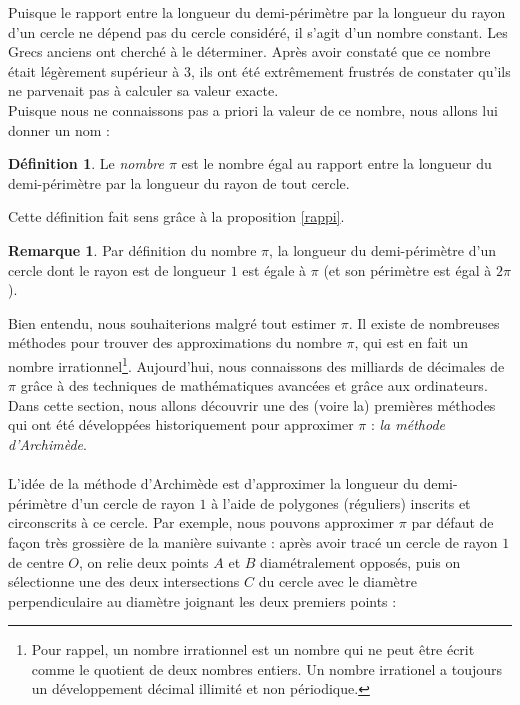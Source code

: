 \documentclass[a4paper,fontsize=13pt]{scrreprt}
\theoremstyle{plain}
\theoremstyle{definition}
\newtheorem{déf}[subsection]{Définition}
\newtheorem{rema}[subsection]{Remarque}
\begin{document}
Puisque le rapport entre la longueur du demi-périmètre par la longueur du rayon d'un cercle ne dépend pas du cercle considéré, il s'agit d'un nombre constant. Les Grecs anciens ont cherché à le déterminer. Après avoir constaté que ce nombre était légèrement supérieur à $3$, ils ont été extrêmement frustrés de constater qu'ils ne parvenait pas à calculer sa valeur exacte. \\
Puisque nous ne connaissons pas a priori la valeur de ce nombre, nous allons lui donner un nom :
\begin{déf}
Le \emph{nombre $\pi$} est le nombre égal au rapport entre la longueur du demi-périmètre par la longueur du rayon de tout cercle.
\end{déf}
Cette définition fait sens grâce à la proposition \ref{rappi}.
\begin{rema}
Par définition du nombre $\pi$, la longueur du demi-périmètre d'un cercle dont le rayon est de longueur $1$ est égale à $\pi$ (et son périmètre est égal à $2\pi$). \\
\begin{center}
\end{center}
\end{rema}
Bien entendu, nous souhaiterions malgré tout estimer $\pi$. Il existe de nombreuses méthodes pour trouver des approximations du nombre $\pi$, qui est en fait un nombre irrationnel\footnote{Pour rappel, un nombre irrationnel est un nombre qui ne peut être écrit comme le quotient de deux nombres entiers. Un nombre irrationel a toujours un développement décimal illimité et non périodique.}. Aujourd'hui, nous connaissons des milliards de décimales de $\pi$ grâce à des techniques de mathématiques avancées et grâce aux ordinateurs. Dans cette section, nous allons découvrir une des (voire la) premières méthodes qui ont été développées historiquement pour approximer $\pi$ : \emph{la méthode d'Archimède}. \\
~\\
L'idée de la méthode d'Archimède est d'approximer la longueur du demi-périmètre d'un cercle de rayon $1$ à l'aide de polygones (réguliers) inscrits et circonscrits à ce cercle. Par exemple, nous pouvons approximer $\pi$ par défaut de façon très grossière de la manière suivante : après avoir tracé un cercle de rayon $1$ de centre $O$, on relie deux points $A$ et $B$ diamétralement opposés, puis on sélectionne une des deux intersections $C$ du cercle avec le diamètre perpendiculaire au diamètre joignant les deux premiers points :
\end{document}
